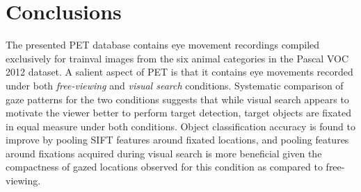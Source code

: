 \documentclass{article}
\begin{document}
\section{Conclusions}\label{Con}
The presented PET database contains eye movement recordings compiled exclusively for trainval images from the six animal categories in the Pascal VOC 2012 dataset. A salient aspect of PET is that it contains eye movements recorded under both \textit{free-viewing} and \textit{visual search} conditions. Systematic comparison of gaze patterns for the two conditions suggests that while visual search appears to motivate the viewer better to perform target detection, target objects are fixated in equal measure under both conditions. Object classification accuracy is found to improve by pooling SIFT features around fixated locations, and pooling features around fixations acquired during visual search is more beneficial given the compactness of gazed locations observed for this condition as compared to free-viewing.





















\end{document}
